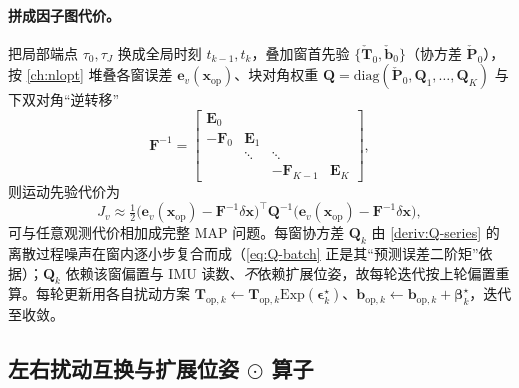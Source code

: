 \paragraph{拼成因子图代价。}
把局部端点 $\tau_0,\tau_J$ 换成全局时刻 $t_{k-1},t_k$，叠加窗首先验 $\{\check{\mathbf{T}}_0,\check{\mathbf{b}}_0\}$（协方差 $\check{\mathbf{P}}_0$），按 \cref{ch:nlopt} 堆叠各窗误差 $\mathbf{e}_v(\mathbf{x}_{\mathrm{op}})$、块对角权重 $\mathbf{Q}=\mathrm{diag}(\check{\mathbf{P}}_0,\mathbf{Q}_1,\dots,\mathbf{Q}_K)$ 与下双对角“逆转移”
\begin{equation}
  \mathbf{F}^{-1}=\begin{bmatrix}\mathbf{E}_0&&&\\-\mathbf{F}_0&\mathbf{E}_1&&\\&\ddots&\ddots&\\&&-\mathbf{F}_{K-1}&\mathbf{E}_K\end{bmatrix},
  \label{eq:preint-Finv}
\end{equation}
则运动先验代价为
\begin{equation}
  J_v\approx\tfrac12\big(\mathbf{e}_v(\mathbf{x}_{\mathrm{op}})-\mathbf{F}^{-1}\delta\mathbf{x}\big)^\top\mathbf{Q}^{-1}\big(\mathbf{e}_v(\mathbf{x}_{\mathrm{op}})-\mathbf{F}^{-1}\delta\mathbf{x}\big),
  \label{eq:preint-cost}
\end{equation}
可与任意观测代价相加成完整 MAP 问题。每窗协方差 $\mathbf{Q}_k$ 由 \cref{deriv:Q-series} 的离散过程噪声在窗内逐小步复合而成（\cref{eq:Q-batch} 正是其“预测误差二阶矩”依据）；$\mathbf{Q}_k$ 依赖该窗偏置与 IMU 读数、\emph{不}依赖扩展位姿，故每轮迭代按上轮偏置重算。每轮更新用各自扰动方案 $\mathbf{T}_{\mathrm{op},k}\leftarrow\mathbf{T}_{\mathrm{op},k}\mathrm{Exp}(\boldsymbol{\epsilon}_k^\star)$、$\mathbf{b}_{\mathrm{op},k}\leftarrow\mathbf{b}_{\mathrm{op},k}+\boldsymbol{\beta}_k^\star$，迭代至收敛。

\subsection{左右扰动互换与扩展位姿 \texorpdfstring{$\odot$}{odot} 算子}
\label{subsec:preint-leftright}

